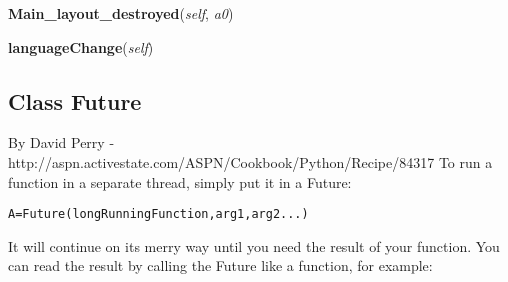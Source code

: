     \label{Epigrass:cpanel:MainPanel:Main_layout_destroyed}

    \vspace{0.5ex}

    \begin{boxedminipage}{\textwidth}

    \raggedright \textbf{Main\_layout\_destroyed}(\textit{self}, \textit{a0})

    \end{boxedminipage}

    \label{Epigrass:cpanel:MainPanel:languageChange}

    \vspace{0.5ex}

    \begin{boxedminipage}{\textwidth}

    \raggedright \textbf{languageChange}(\textit{self})

    \end{boxedminipage}



\subsection{Class Future}

    \label{Epigrass:epigrass:Future}
By David Perry - 
http://aspn.activestate.com/ASPN/Cookbook/Python/Recipe/84317 To run a 
function in a separate thread, simply put it in a Future:

\begin{alltt}
\pysrcprompt{{\textgreater}{\textgreater}{\textgreater} }A=Future(longRunningFunction, arg1, arg2 ...)\end{alltt}
It will continue on its merry way until you need the result of your 
function. You can read the result by calling the Future like a function, 
for example:

